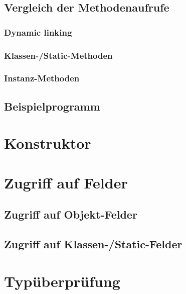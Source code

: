 \documentclass[conference]{IEEEtran}
\begin{document}
\subsection{Vergleich der Methodenaufrufe}
\subsubsection{Dynamic linking}
\subsubsection{Klassen-/Static-Methoden}
\subsubsection{Instanz-Methoden}

\subsection{Beispielprogramm}

\section{Konstruktor}

\section{Zugriff auf Felder}
\subsection{Zugriff auf Objekt-Felder}
\subsection{Zugriff auf Klassen-/Static-Felder}

\section{Typüberprüfung}


 
\end{document}
